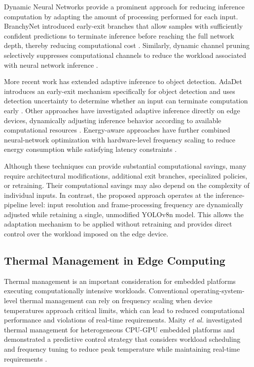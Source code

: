 \documentclass{ieeeaccess}
\begin{document}
Dynamic Neural Networks provide a prominent approach for reducing inference computation by adapting the amount of processing performed for each input. BranchyNet introduced early-exit branches that allow samples with sufficiently confident predictions to terminate inference before reaching the full network depth, thereby reducing computational cost \cite{b23}. Similarly, dynamic channel pruning selectively suppresses computational channels to reduce the workload associated with neural network inference \cite{b21}.

More recent work has extended adaptive inference to object detection. AdaDet introduces an early-exit mechanism specifically for object detection and uses detection uncertainty to determine whether an input can terminate computation early \cite{b17}. Other approaches have investigated adaptive inference directly on edge devices, dynamically adjusting inference behavior according to available computational resources \cite{b18}. Energy-aware approaches have further combined neural-network optimization with hardware-level frequency scaling to reduce energy consumption while satisfying latency constraints \cite{b8}.

Although these techniques can provide substantial computational savings, many require architectural modifications, additional exit branches, specialized policies, or retraining. Their computational savings may also depend on the complexity of individual inputs. In contrast, the proposed approach operates at the inference-pipeline level: input resolution and frame-processing frequency are dynamically adjusted while retaining a single, unmodified YOLOv8n model. This allows the adaptation mechanism to be applied without retraining and provides direct control over the workload imposed on the edge device.

\subsection{Thermal Management in Edge Computing}

Thermal management is an important consideration for embedded platforms executing computationally intensive workloads. Conventional operating-system-level thermal management can rely on frequency scaling when device temperatures approach critical limits, which can lead to reduced computational performance and violations of real-time requirements. Maity \emph{et al.} investigated thermal management for heterogeneous CPU-GPU embedded platforms and demonstrated a predictive control strategy that considers workload scheduling and frequency tuning to reduce peak temperature while maintaining real-time requirements \cite{b19}.
\end{document}
